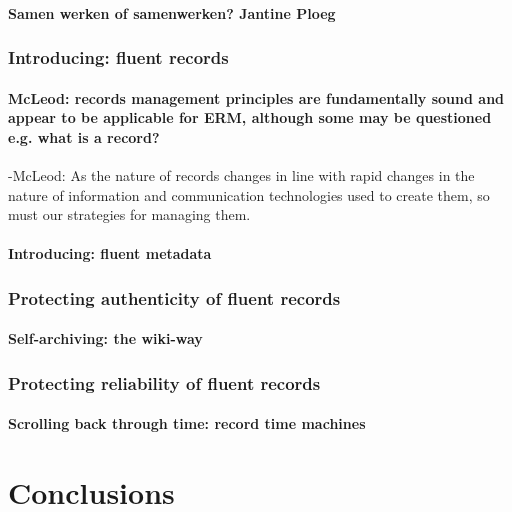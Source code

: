 \documentclass[twoside,11pt]{Latex/Classes/PhDthesisPSnPDF}
\begin{document}
\subsubsection{Samen werken of samenwerken? Jantine Ploeg}
\subsection{Introducing: fluent records}
\subsubsection{McLeod: records management principles are fundamentally sound and appear to be applicable for ERM, although some may be questioned e.g. what is a record?}
-McLeod: As the nature of records changes in line with rapid changes in the nature of
information and communication technologies used to create them, so must our strategies for
managing them.
\subsubsection{Introducing: fluent metadata}
\subsection{Protecting authenticity of fluent records}
\subsubsection{Self-archiving: the wiki-way}
\subsection{Protecting reliability of fluent records} 
\subsubsection{Scrolling back through time: record time machines}
\chapter{Conclusions}

			
	




\end{document}
